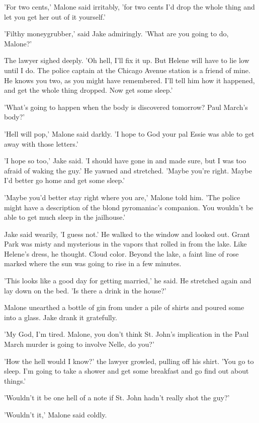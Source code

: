 \documentclass{novel}
\begin{document}
'For two cents,' Malone said irritably, 'for two cents I’d drop the whole thing and let you get her out of it yourself.'

'Filthy moneygrubber,' said Jake admiringly. 'What are you going to do, Malone?'

The lawyer sighed deeply. 'Oh hell, I’ll fix it up. But Helene will have to lie low until I do. The police captain at the Chicago Avenue station is a friend of mine. He knows you two, as you might have remembered. I’ll tell him how it happened, and get the whole thing dropped. Now get some sleep.'

'What’s going to happen when the body is discovered tomorrow? Paul March’s body?'

'Hell will pop,' Malone said darkly. 'I hope to God your pal Essie was able to get away with those letters.'

'I hope so too,' Jake said. 'I should have gone in and made sure, but I was too afraid of waking the guy.' He yawned and stretched. 'Maybe you’re right. Maybe I’d better go home and get some sleep.'

'Maybe you’d better stay right where you are,' Malone told him. 'The police might have a description of the blond pyromaniac’s companion. You wouldn’t be able to get much sleep in the jailhouse.'

Jake said wearily, 'I guess not.' He walked to the window and looked out. Grant Park was misty and mysterious in the vapors that rolled in from the lake. Like Helene’s dress, he thought. Cloud color. Beyond the lake, a faint line of rose marked where the sun was going to rise in a few minutes.

'This looks like a good day for getting married,' he said. He stretched again and lay down on the bed. 'Is there a drink in the house?'

Malone unearthed a bottle of gin from under a pile of shirts and poured some into a glass. Jake drank it gratefully.

'My God, I’m tired. Malone, you don’t think St. John’s implication in the Paul March murder is going to involve Nelle, do you?'

'How the hell would I know?' the lawyer growled, pulling off his shirt. 'You go to sleep. I’m going to take a shower and get some breakfast and go find out about things.'

'Wouldn’t it be one hell of a note if St. John hadn’t really shot the guy?'

'Wouldn’t it,' Malone said coldly.
\end{document}
